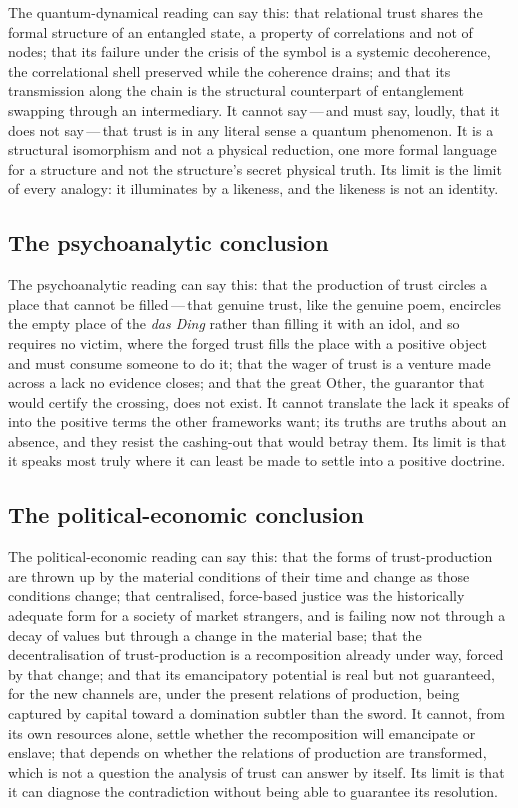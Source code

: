 The quantum-dynamical reading can say this: that relational trust shares the formal structure of an entangled state, a property of correlations and not of nodes; that its failure under the crisis of the symbol is a systemic decoherence, the correlational shell preserved while the coherence drains; and that its transmission along the chain is the structural counterpart of entanglement swapping through an intermediary. It cannot say\,---\,and must say, loudly, that it does not say\,---\,that trust is in any literal sense a quantum phenomenon. It is a structural isomorphism and not a physical reduction, one more formal language for a structure and not the structure's secret physical truth. Its limit is the limit of every analogy: it illuminates by a likeness, and the likeness is not an identity.

\subsection*{The psychoanalytic conclusion}
\label{p13:sub:concl-psych}

The psychoanalytic reading can say this: that the production of trust circles a place that cannot be filled\,---\,that genuine trust, like the genuine poem, encircles the empty place of the \emph{das Ding} rather than filling it with an idol, and so requires no victim, where the forged trust fills the place with a positive object and must consume someone to do it; that the wager of trust is a venture made across a lack no evidence closes; and that the great Other, the guarantor that would certify the crossing, does not exist. It cannot translate the lack it speaks of into the positive terms the other frameworks want; its truths are truths about an absence, and they resist the cashing-out that would betray them. Its limit is that it speaks most truly where it can least be made to settle into a positive doctrine.

\subsection*{The political-economic conclusion}
\label{p13:sub:concl-pol}

The political-economic reading can say this: that the forms of trust-production are thrown up by the material conditions of their time and change as those conditions change; that centralised, force-based justice was the historically adequate form for a society of market strangers, and is failing now not through a decay of values but through a change in the material base; that the decentralisation of trust-production is a recomposition already under way, forced by that change; and that its emancipatory potential is real but not guaranteed, for the new channels are, under the present relations of production, being captured by capital toward a domination subtler than the sword. It cannot, from its own resources alone, settle whether the recomposition will emancipate or enslave; that depends on whether the relations of production are transformed, which is not a question the analysis of trust can answer by itself. Its limit is that it can diagnose the contradiction without being able to guarantee its resolution.

